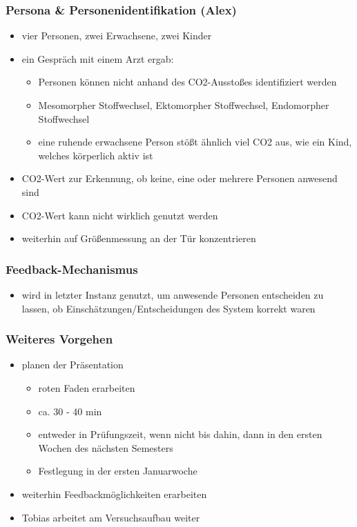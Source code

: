 \subsubsection{Persona \& Personenidentifikation (Alex)}

\begin{itemize}
	\item vier Personen, zwei Erwachsene, zwei Kinder
	\item ein Gespräch mit einem Arzt ergab:
	\begin{itemize}
		\item Personen können nicht anhand des CO2-Ausstoßes identifiziert werden
		\item Mesomorpher Stoffwechsel, Ektomorpher Stoffwechsel, Endomorpher Stoffwechsel
		\item eine ruhende erwachsene Person stößt ähnlich viel CO2 aus, wie ein Kind, welches körperlich aktiv ist
	\end{itemize}
	\item CO2-Wert zur Erkennung, ob keine, eine oder mehrere Personen anwesend sind
	\item CO2-Wert kann nicht wirklich genutzt werden
	\item weiterhin auf Größenmessung an der Tür konzentrieren
\end{itemize}

\subsubsection{Feedback-Mechanismus}

\begin{itemize}
	\item wird in letzter Instanz genutzt, um anwesende Personen entscheiden zu lassen, ob Einschätzungen/Entscheidungen des System korrekt waren
\end{itemize}

\subsubsection{Weiteres Vorgehen}

\begin{itemize}
	\item planen der Präsentation
	\begin{itemize}
		\item roten Faden erarbeiten
		\item ca. 30 - 40 min
		\item entweder in Prüfungszeit, wenn nicht bis dahin, dann in den ersten Wochen des nächsten Semesters
		\item Festlegung in der ersten Januarwoche
	\end{itemize}
	\item weiterhin Feedbackmöglichkeiten erarbeiten
	\item Tobias arbeitet am Versuchsaufbau weiter
\end{itemize}

